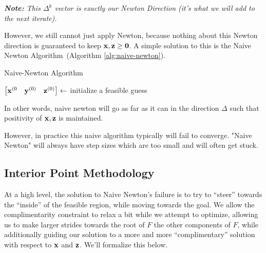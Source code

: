 \textit{\textbf{Note:} This $\Delta^k$ vector is \textit{exactly} our Newton Direction 
(it's what we will add to the next iterate).}

However, we still cannot just apply Newton, because nothing about this 
Newton direction is guaranteed to keep $\mathbf{x}, \mathbf{z} \geq \mathbf{0}$. 
A simple solution to this is the Naive Newton 
Algorithm~(Algorithm \ref{alg:naive-newton}).

\begin{algorithm}\label{alg:naive-newton}
\caption{Naive-Newton Algorithm}
	\KwOut{$\vx^*, \vy^*, \vz^*$}
	$\begin{bmatrix} \mathbf{x}^{(0} & \mathbf{y}^{(0)} & \mathbf{z}^{(0)} \end{bmatrix} \leftarrow $ initialize a feasible guess\;
\end{algorithm}

In other words, naive newton will 
go as far as it can in the direction $\Delta$ such that positivity of
$\mathbf{x}, \mathbf{z}$ is maintained.

However, in practice this naive algorithm typically will fail to converge.
"Naive Newton" will always have step sizes which are too small
and will often get stuck. 


\subsection{Interior Point Methodology}

At a high level, the solution to Naive Newton's failure is to try to
``steer''
towards the ``inside'' of the feasible region, while moving towards the goal. 
We allow the complimentarity constraint to relax a bit while we attempt to optimize,
allowing us to make larger strides towards the root of $F$ the other components
of $F$, while additionally
guiding our solution to a more and more ``complimentary'' solution with respect
to $\mathbf{x}$ and $\mathbf{z}$.  We'll formalize this below.

